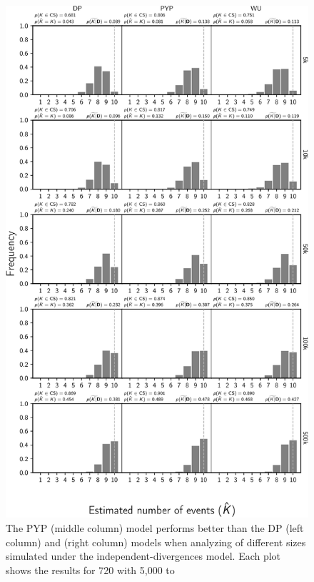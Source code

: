 \begin{figure}[htbp]
    \begin{center}
        \includegraphics[width=\textwidth,height=0.9\textheight,keepaspectratio]{../images/from-project-repo/nchars-nevents-cropped.pdf}
        \captionsetup{name=Figure S, labelformat=noSpace, listformat=sFigList}
        \caption{\scriptsize
        The PYP (middle column) model performs better than the DP (left column)
        and \wunif (right column) models when analyzing \datasets of different
        sizes simulated under the independent-divergences model.
        Each plot shows the results for 720 \datasets with 5,000 to
}
\end{center}
\end{figure}
